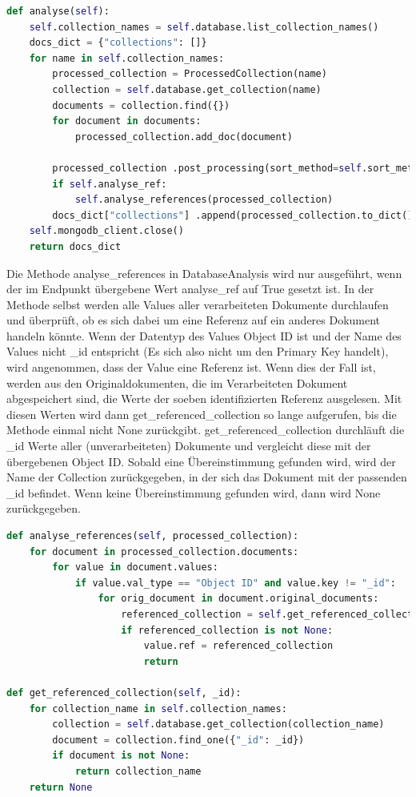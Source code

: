 \begin{lstlisting}[language=python, caption={DatabaseAnalysis.analyse},label={lst:backend_analyse}]
def analyse(self):
    self.collection_names = self.database.list_collection_names()
    docs_dict = {"collections": []}
    for name in self.collection_names:
        processed_collection = ProcessedCollection(name)
        collection = self.database.get_collection(name)
        documents = collection.find({})
        for document in documents:
            processed_collection.add_doc(document)

        processed_collection .post_processing(sort_method=self.sort_method)
        if self.analyse_ref:
            self.analyse_references(processed_collection)
        docs_dict["collections"] .append(processed_collection.to_dict())
    self.mongodb_client.close()
    return docs_dict
\end{lstlisting}

Die Methode analyse\_references in DatabaseAnalysis wird nur ausgeführt, wenn der im Endpunkt übergebene Wert analyse\_ref auf True gesetzt ist.
In der Methode selbst werden alle Values aller verarbeiteten Dokumente durchlaufen und überprüft, ob es sich dabei um eine Referenz auf ein anderes Dokument handeln könnte.
Wenn der Datentyp des Values Object ID ist und der Name des Values nicht \_id entspricht (Es sich also nicht um den Primary Key handelt), wird angenommen, dass der Value eine Referenz ist.
Wenn dies der Fall ist, werden aus den Originaldokumenten, die im Verarbeiteten Dokument abgespeichert sind, die Werte der soeben identifizierten Referenz ausgelesen.
Mit diesen Werten wird dann get\_referenced\_collection so lange aufgerufen, bis die Methode einmal nicht None zurückgibt.
get\_referenced\_collection durchläuft die \_id Werte aller (unverarbeiteten) Dokumente und vergleicht diese mit der übergebenen Object ID.
Sobald eine Übereinstimmung gefunden wird, wird der Name der Collection zurückgegeben, in der sich das Dokument mit der passenden \_id befindet.
Wenn keine Übereinstimmung gefunden wird, dann wird None zurückgegeben.

\begin{lstlisting}[language=python, caption={DatabaseAnalysis.analyse\_references},label={lst:backend_analyse_ref}]
def analyse_references(self, processed_collection):
    for document in processed_collection.documents:
        for value in document.values:
            if value.val_type == "Object ID" and value.key != "_id":
                for orig_document in document.original_documents:
                    referenced_collection = self.get_referenced_collection (orig_document.get(value.key))
                    if referenced_collection is not None:
                        value.ref = referenced_collection
                        return

def get_referenced_collection(self, _id):
    for collection_name in self.collection_names:
        collection = self.database.get_collection(collection_name)
        document = collection.find_one({"_id": _id})
        if document is not None:
            return collection_name
    return None
\end{lstlisting}

